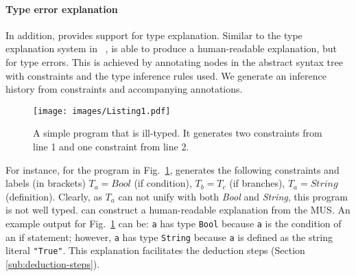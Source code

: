  


\paragraph{Type error explanation}

In addition, \chameleon{} provides support for type explanation. Similar to the type explanation system  in ~\cite{Jun2002-xp},  \chameleon{} is able to produce a human-readable explanation, but for type errors. This is achieved by annotating nodes in the abstract syntax tree with constraints and the type inference rules used. We generate an inference history from constraints and accompanying annotations. 




\begin{figure}
    \centering
    \texttt{[image: images/Listing1.pdf]}
    \caption{A simple program that is ill-typed. It generates two constraints from line 1 and one constraint from line 2. }
    \label{fig:listing1}
\end{figure}

For instance, for the program in Fig.~\ref{fig:listing1}, \chameleon{}  generates the following constraints and labels (in brackets) $T_a = Bool$ (if condition), $T_b = T_c$ (if branches), $T_a= String$  (definition). Clearly, as $T_a$ can not unify with both \textit{Bool} and \textit{String}, this program is not well typed. \chameleon{} can construct a human-readable explanation from the MUS. An example output for Fig.~\ref{fig:listing1} can be: \texttt{a} has type \texttt{Bool} because \texttt{a} is the condition of an if statement; however, \texttt{a} has type \texttt{String} because \texttt{a} is defined as the string literal \texttt{"True"}. This explanation facilitates the deduction steps (Section \ref{sub:deduction-steps}). 






